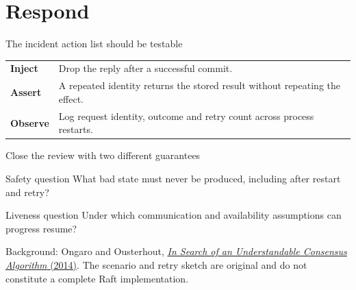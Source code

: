 \documentclass[10pt,aspectratio=169]{beamer}
\begin{document}
\section{Respond}
\begin{frame}{The incident action list should be testable}
\begin{tabular}{p{}p{}}
\textbf{Inject} & Drop the reply after a successful commit.\\[1ex]
\textbf{Assert} & A repeated identity returns the stored result without repeating the effect.\\[1ex]
\textbf{Observe} & Log request identity, outcome and retry count across process restarts.
\end{tabular}
\end{frame}
\begin{frame}{Close the review with two different guarantees}
\begin{block}{Safety question}
What bad state must never be produced, including after restart and retry?
\end{block}
\begin{exampleblock}{Liveness question}
Under which communication and availability assumptions can progress resume?
\end{exampleblock}
\small Background: Ongaro and Ousterhout, \href{https://raft.github.io/raft.pdf}{\emph{In Search of an Understandable Consensus Algorithm} (2014)}.
The scenario and retry sketch are original and do not constitute a complete Raft implementation.
\end{frame}
\end{document}

